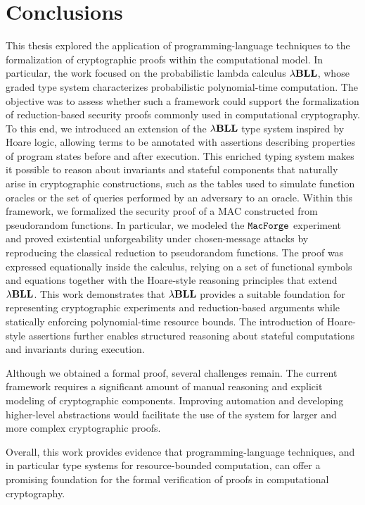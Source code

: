 \chapter*{Conclusions}\label{chapter:conclusion}
\lhead[\fancyplain{}{\bfseries\thepage}]{\fancyplain{}{\bfseries\rightmark}}

This thesis explored the application of programming-language techniques to the formalization of cryptographic proofs within the computational model. In particular, the work focused on the probabilistic lambda calculus ${\lambda}\mathbf{BLL}$, whose graded type system characterizes probabilistic polynomial-time computation. The objective was to assess whether such a framework could support the formalization of reduction-based security proofs commonly used in computational cryptography. To this end, we introduced an extension of the ${\lambda}\mathbf{BLL}$ type system inspired by Hoare logic, allowing terms to be annotated with assertions describing properties of program states before and after execution. This enriched typing system makes it possible to reason about invariants and stateful components that naturally arise in cryptographic constructions, such as the tables used to simulate function oracles or the set of queries performed by an adversary to an oracle. Within this framework, we formalized the security proof of a MAC constructed from pseudorandom functions. In particular, we modeled the $\mathtt{MacForge}$ experiment and proved existential unforgeability under chosen-message attacks by reproducing the classical reduction to pseudorandom functions. The proof was expressed equationally inside the calculus, relying on a set of functional symbols and equations together with the Hoare-style reasoning principles that extend ${\lambda}\mathbf{BLL}$. This work demonstrates that ${\lambda}\mathbf{BLL}$ provides a suitable foundation for representing cryptographic experiments and reduction-based arguments while statically enforcing polynomial-time resource bounds. The introduction of Hoare-style assertions further enables structured reasoning about stateful computations and invariants during execution.

Although we obtained a formal proof, several challenges remain. The current framework requires a significant amount of manual reasoning and explicit modeling of cryptographic components. Improving automation and developing higher-level abstractions would facilitate the use of the system for larger and more complex cryptographic proofs. 

Overall, this work provides evidence that programming-language techniques, and in particular type systems for resource-bounded computation, can offer a promising foundation for the formal verification of proofs in computational cryptography.
